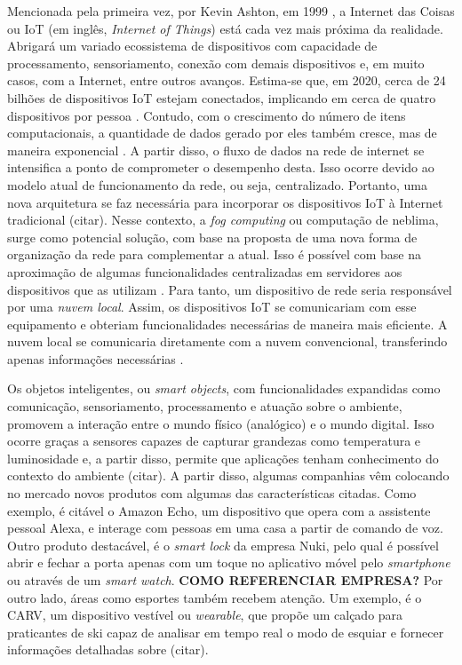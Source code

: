 Mencionada pela primeira vez, por Kevin Ashton, em 1999 \cite{Ashton2009}, a Internet das Coisas ou IoT (em inglês, \textit{Internet of Things}) está cada vez mais próxima da realidade. Abrigará um variado ecossistema de dispositivos com capacidade de processamento, sensoriamento, conexão com demais dispositivos e, em muito casos, com a Internet, entre outros avanços. Estima-se que, em 2020, cerca de 24 bilhões de dispositivos IoT estejam conectados, implicando em cerca de quatro dispositivos por pessoa \cite{Meola2016}.   
Contudo, com o crescimento do número de itens computacionais, a quantidade de dados gerado por eles também cresce, mas de maneira exponencial \cite{Chiang2016}. A partir disso, o fluxo de dados na rede de internet se intensifica a ponto de comprometer o desempenho desta. Isso ocorre devido ao modelo atual de funcionamento da rede, ou seja, centralizado. Portanto, uma nova arquitetura se faz necessária para incorporar os dispositivos IoT à Internet tradicional (citar). 
Nesse contexto, a \textit{fog computing} ou computação de neblima, surge como potencial solução, com base na proposta de uma nova forma de organização da rede para complementar a atual. Isso é possível com base na aproximação de algumas funcionalidades centralizadas em servidores aos dispositivos que as utilizam \cite{Chiang2016}. Para tanto, um dispositivo de rede seria responsável por uma \textit{nuvem local}. Assim, os dispositivos IoT se comunicariam com esse equipamento e obteriam funcionalidades necessárias de maneira mais eficiente. A nuvem local se comunicaria diretamente com a nuvem convencional, transferindo apenas informações necessárias \cite{Syed2016}.

Os objetos inteligentes, ou \textit{smart objects}, com funcionalidades expandidas como comunicação, sensoriamento, processamento e atuação sobre o ambiente, promovem a interação entre o mundo físico (analógico) e o mundo digital\cite{Stojkoska2017}. Isso ocorre graças a sensores capazes de capturar grandezas como temperatura e luminosidade e, a partir disso, permite que aplicações tenham conhecimento do contexto do ambiente (citar). A partir disso, algumas companhias vêm colocando no mercado novos produtos com algumas das características citadas. Como exemplo, é citável o Amazon Echo, um dispositivo que opera com a assistente pessoal Alexa, e interage com pessoas em uma casa a partir de comando de voz. Outro produto destacável, é o \textit{smart lock} da empresa Nuki, pelo qual é possível abrir e fechar a porta apenas com um toque no aplicativo móvel pelo \textit{smartphone} ou através de um \textit{smart watch}.  \textbf{COMO REFERENCIAR EMPRESA?}  Por outro lado, áreas como esportes também recebem atenção. Um exemplo, é o CARV, um dispositivo vestível ou \textit{wearable}, que propõe um calçado para praticantes de ski capaz de analisar em tempo real o modo de esquiar e fornecer informações detalhadas sobre (citar).


